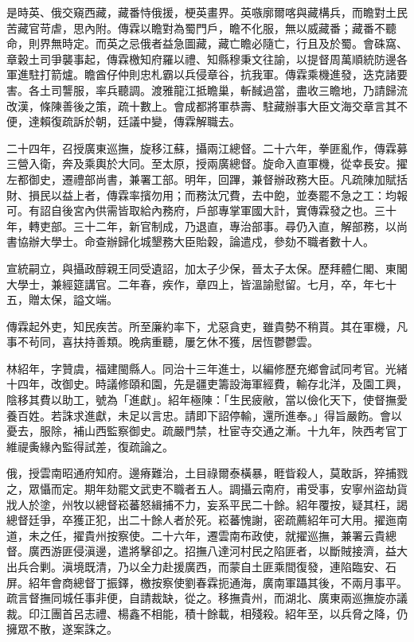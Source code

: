 \begin{pinyinscope}
是時英、俄交窺西藏，藏番恃俄援，梗英畫界。英嗾廓爾喀與藏構兵，而瞻對土民苦藏官苛虐，思內附。傳霖以瞻對為蜀門戶，瞻不化服，無以威藏番；藏番不聽命，則界無時定。而英之忌俄者益急圖藏，藏亡瞻必隨亡，行且及於蜀。會硃窩、章穀土司爭襲事起，傳霖檄知府羅以禮、知縣穆秉文往諭，以提督周萬順統防邊各軍進駐打箭爐。瞻酋仔仲則忠札霸以兵侵章谷，抗我軍。傳霖乘機進發，迭克諸要害。各土司讋服，率兵聽調。渡雅龍江抵瞻巢，斬馘過當，盡收三瞻地，乃請歸流改漢，條陳善後之策，疏十數上。會成都將軍恭壽、駐藏辦事大臣文海交章言其不便，達賴復疏訴於朝，廷議中變，傳霖解職去。

二十四年，召授廣東巡撫，旋移江蘇，攝兩江總督。二十六年，拳匪亂作，傳霖募三營入衛，奔及乘輿於大同。至太原，授兩廣總督。旋命入直軍機，從幸長安。擢左都御史，遷禮部尚書，兼署工部。明年，回蹕，兼督辦政務大臣。凡疏陳加賦括財、損民以益上者，傳霖率擯勿用；而務汰冗費，去中飽，並奏罷不急之工：均報可。有詔自後宮內供需皆取給內務府，戶部專掌軍國大計，實傳霖發之也。三十年，轉吏部。三十二年，新官制成，乃退直，專治部事。尋仍入直，解部務，以尚書協辦大學士。命查辦歸化城墾務大臣貽穀，論遣戍，參劾不職者數十人。

宣統嗣立，與攝政醇親王同受遺詔，加太子少保，晉太子太保。歷拜體仁閣、東閣大學士，兼經筵講官。二年春，疾作，章四上，皆溫諭慰留。七月，卒，年七十五，贈太保，謚文端。

傳霖起外吏，知民疾苦。所至廉約率下，尤惡貪吏，雖貴勢不稍貰。其在軍機，凡事不茍同，喜扶持善類。晚病重聽，屢乞休不獲，居恆鬱鬱雲。

林紹年，字贊虞，福建閩縣人。同治十三年進士，以編修歷充鄉會試同考官。光緒十四年，改御史。時議修頤和園，先是疆吏籌設海軍經費，輸存北洋，及園工興，陰移其費以助工，號為「進獻」。紹年極陳：「生民疲敝，當以儉化天下，使督撫愛養百姓。若誅求進獻，未足以言忠。請即下詔停輸，還所進奉。」得旨嚴飭。會以憂去，服除，補山西監察御史。疏嚴門禁，杜宦寺交通之漸。十九年，陜西考官丁維禔夤緣內監得試差，復疏論之。

俄，授雲南昭通府知府。邊瘠難治，土目祿爾泰橫暴，睚眥殺人，莫敢訴，猝捕戮之，眾懾而定。期年劾罷文武吏不職者五人。調攝云南府，甫受事，安寧州盜劫貨戕人於塗，州牧以總督崧蕃怒緝捕不力，妄系平民二十餘。紹年覆按，疑其枉，謁總督廷爭，卒獲正犯，出二十餘人者於死。崧蕃愧謝，密疏薦紹年可大用。擢迤南道，未之任，擢貴州按察使。二十六年，遷雲南布政使，就擢巡撫，兼署云貴總督。廣西游匪侵滇邊，遣將擊卻之。招撫八達河村民之陷匪者，以斷賊接濟，益大出兵合剿。滇境既清，乃以全力赴援廣西，而蒙自土匪乘間復發，連陷臨安、石屏。紹年會商總督丁振鐸，檄按察使劉春霖扼通海，廣南軍躡其後，不兩月事平。疏言督撫同城任事非便，自請裁缺，從之。移撫貴州，而湖北、廣東兩巡撫旋亦議裁。印江團首呂志禮、楊鑫不相能，積十餘載，相殘殺。紹年至，以兵脅之降，仍擁眾不散，遂案誅之。


\end{pinyinscope}
